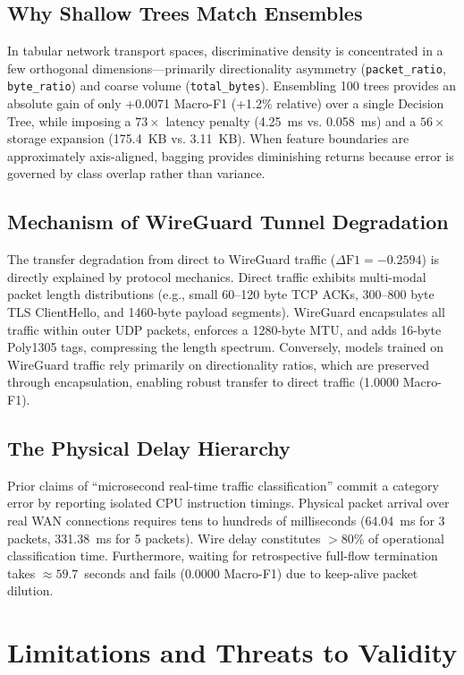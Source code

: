 \documentclass[conference]{IEEEtran}
\begin{document}
\subsection{Why Shallow Trees Match Ensembles}
In tabular network transport spaces, discriminative density is concentrated in a few orthogonal dimensions---primarily directionality asymmetry (\texttt{packet\_ratio}, \texttt{byte\_ratio}) and coarse volume (\texttt{total\_bytes}). Ensembling 100 trees provides an absolute gain of only +0.0071 Macro-F1 (+1.2\% relative) over a single Decision Tree, while imposing a $73\times$ latency penalty (4.25~ms vs. 0.058~ms) and a $56\times$ storage expansion (175.4~KB vs. 3.11~KB). When feature boundaries are approximately axis-aligned, bagging provides diminishing returns because error is governed by class overlap rather than variance.

\subsection{Mechanism of WireGuard Tunnel Degradation}
The transfer degradation from direct to WireGuard traffic ($\Delta\text{F1} = -0.2594$) is directly explained by protocol mechanics. Direct traffic exhibits multi-modal packet length distributions (e.g., small 60--120 byte TCP ACKs, 300--800 byte TLS ClientHello, and 1460-byte payload segments). WireGuard encapsulates all traffic within outer UDP packets, enforces a 1280-byte MTU, and adds 16-byte Poly1305 tags, compressing the length spectrum. Conversely, models trained on WireGuard traffic rely primarily on directionality ratios, which are preserved through encapsulation, enabling robust transfer to direct traffic (1.0000 Macro-F1).

\subsection{The Physical Delay Hierarchy}
Prior claims of ``microsecond real-time traffic classification'' commit a category error by reporting isolated CPU instruction timings. Physical packet arrival over real WAN connections requires tens to hundreds of milliseconds (64.04~ms for 3 packets, 331.38~ms for 5 packets). Wire delay constitutes $>80\%$ of operational classification time. Furthermore, waiting for retrospective full-flow termination takes $\approx 59.7$~seconds and fails (0.0000 Macro-F1) due to keep-alive packet dilution.

\section{Limitations and Threats to Validity}
\label{sec:limitations}
\end{document}
